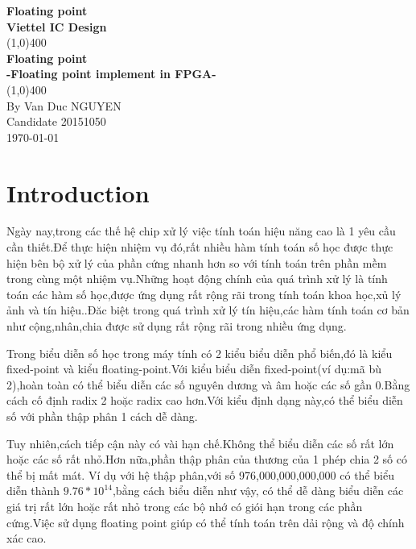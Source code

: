 \documentclass[11pt,a4paper,vietnamese]{report}
\begin{document}
\begin{titlepage}
\begin{center}
\vspace*{1cm}
\Large\textbf{Floating point}\\
\large\textbf{Viettel IC Design}\\
\vfill
\line(1,0){400}\\[1mm]
\huge{\textbf{Floating point}}\\[3mm]
\Large{\textbf{-Floating point implement in FPGA-}}\\[1mm]
\line(1,0){400}\\
\vfill
By Van Duc NGUYEN\\
Candidate 20151050 \\
\today
\end{center}
\end{titlepage}
	
\tableofcontents
\listoffigures
\listoftables
\thispagestyle{empty}
\clearpage

\setcounter{page}{1}
\chapter{Introduction}
Ngày nay,trong các thế hệ chip xử lý việc tính toán hiệu năng cao là 1 yêu cầu cần thiết.Để thực hiện nhiệm vụ đó,rất nhiều hàm tính toán số học được thực hiện bên bộ xử lý của phần cứng nhanh hơn so với tính toán trên phần mềm trong cùng một nhiệm vụ.Những hoạt động chính của quá trình xử lý là tính toán các hàm số học,được ứng dụng rất rộng rãi trong tính toán khoa học,xủ lý ảnh và tín hiệu..Đăc biệt trong quá trình xử lý tín hiệu,các hàm tính toán cơ bản như cộng,nhân,chia được sử dụng rất rộng rãi trong nhiều ứng dụng.


Trong biểu diễn số học trong máy tính có 2 kiểu biểu diễn phổ biến,đó là kiểu fixed-point và kiểu floating-point.Với kiểu biểu diễn fixed-point(ví dụ:mã bù 2),hoàn toàn có thể biểu diễn các số nguyên dương và âm hoặc các số gần 0.Bằng cách cố định radix 2 hoặc radix cao hơn.Với kiểu định dạng này,có thể biểu diễn số với phần thập phân 1 cách dễ dàng.

Tuy nhiên,cách tiếp cận này có vài hạn chế.Không thể biểu diễn các số rất lớn hoặc các số rất nhỏ.Hơn nữa,phần thập phân của thương của 1 phép chia 2 số có thể bị mất mát.
Ví dụ với hệ thập phân,với số 976,000,000,000,000 có thể biểu diễn thành $9.76*10^{14}$,bằng cách biểu diễn như vậy,
có thể dễ dàng biểu diễn các giá trị rất lớn hoặc rất nhỏ trong các bộ nhớ có giói hạn trong các phần cứng.Việc sử dụng floating point giúp có thể tính toán trên dải rộng và độ chính xác cao.
\end{document}
